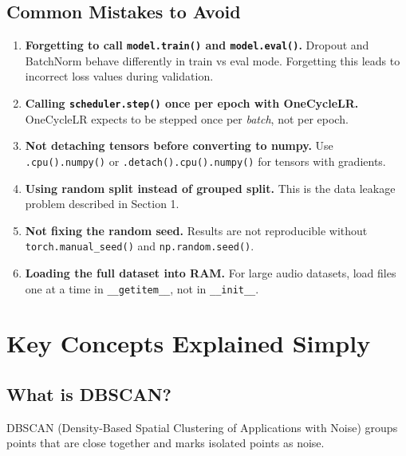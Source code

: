 \documentclass[12pt,a4paper]{article}
\begin{document}
\subsection{Common Mistakes to Avoid}

\begin{warningbox}
\begin{enumerate}[nosep]
  \item \textbf{Forgetting to call \texttt{model.train()} and \texttt{model.eval()}.} Dropout and BatchNorm behave differently in train vs eval mode. Forgetting this leads to incorrect loss values during validation.
  \item \textbf{Calling \texttt{scheduler.step()} once per epoch with OneCycleLR.} OneCycleLR expects to be stepped once per \textit{batch}, not per epoch.
  \item \textbf{Not detaching tensors before converting to numpy.} Use \texttt{.cpu().numpy()} or \texttt{.detach().cpu().numpy()} for tensors with gradients.
  \item \textbf{Using random split instead of grouped split.} This is the data leakage problem described in Section 1.
  \item \textbf{Not fixing the random seed.} Results are not reproducible without \texttt{torch.manual\_seed()} and \texttt{np.random.seed()}.
  \item \textbf{Loading the full dataset into RAM.} For large audio datasets, load files one at a time in \texttt{\_\_getitem\_\_}, not in \texttt{\_\_init\_\_}.
\end{enumerate}
\end{warningbox}


\section{Key Concepts Explained Simply}

\subsection{What is DBSCAN?}

DBSCAN (Density-Based Spatial Clustering of Applications with Noise) groups points that are close together and marks isolated points as noise.
\end{document}
